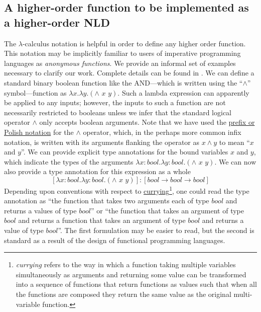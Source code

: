 \subsection{A higher-order function to be implemented as a higher-order NLD}

The $\lambda$-calculus notation is helpful in
order to define any higher order function. This notation may be
implicitly familiar to users of imperative programming languages as {\it anonymous functions}. We provide an informal set of examples necessary to clarify our work. Complete details can be found in \cite{Barendregt1985}. We can define a
standard binary boolean function like the AND---which is written using the ``$\wedge$'' symbol---function as $\lambda x. \lambda y.(\wedge\,\,x\,\,y)$. Such a lambda expression can apparently be applied to any inputs;
however, the inputs to such a function are not necessarily restricted to
booleans unless we infer that the standard logical operator
$\wedge$ only accepts boolean arguments.
Note that we have used the
\href{http://en.wikipedia.org/wiki/Polish\_notation}{prefix or Polish
notation} for the $\wedge$ operator, which,
in the perhaps more common infix notation, is written with its arguments
flanking the operator as $x \wedge y$ to mean
``$x$ and
$y$''. We can provide explicit type
annotations for the bound variables $x$
and $y$, which indicate the types of
the arguments $\lambda x:bool. \lambda y:bool.(\wedge\,\,x\,\,y)$. We can now also provide a type annotation for this expression as a whole
\begin{equation}\label{eq:boolfulltype}
[\lambda x:bool. \lambda y:bool.(\wedge\,\,x\,\,y)]:[bool \rightarrow bool \rightarrow bool]
\end{equation}
Depending upon conventions with respect to
\href{http://en.wikipedia.org/wiki/Currying}{currying}\footnote{{\it currying} refers to the way in which a function taking multiple variables simultaneously as arguments and returning some value can be transformed into a sequence of functions that return functions as values such that when all the functions are composed they return the same value as the original multi-variable function.}, one could read
the type annotation as ``the function that takes two arguments each of
type $bool$ and returns a values of type
$bool$'' or ``the function that takes an
argument of type $bool$ and returns a
function that takes an argument of type
$bool$ and returns a value of type
$bool$''. The first formulation may be
easier to read, but the second is standard as a result of the design of
functional programming languages.

